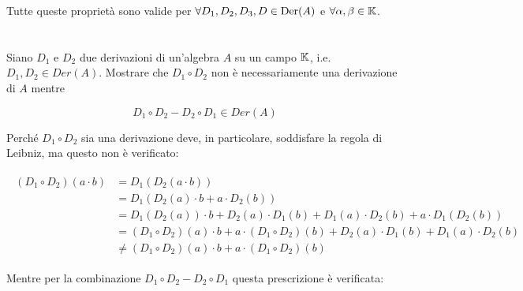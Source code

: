 Tutte queste proprietà sono valide per $ \forall D_{1}, D_{2}, D_{3}, D \in \operatorname{Der}(A) $ e $ \forall \alpha, \beta \in \mathbb{K} $.

\tocless\section{}\label{es1-11}

\begin{tcolorbox}
	Siano $ D_{1} $ e $ D_{2} $ due derivazioni di un'algebra $ A $ su un campo $ \mathbb{K} $, i.e. $ D_{1},D_{2} \in Der(A) $. Mostrare che $ D_{1} \circ D_{2} $ non è necessariamente una derivazione di $ A $ mentre
	
	\begin{equation}
		D_{1} \circ D_{2} - D_{2} \circ D_{1} \in Der(A)
	\end{equation}
\end{tcolorbox}

Perché $ D_{1} \circ D_{2} $ sia una derivazione deve, in particolare, soddisfare la regola di Leibniz, ma questo non è verificato:

\begin{align}
	\begin{split}
		(D_{1} \circ D_{2})(a \cdot b) &= D_{1}(D_{2}(a \cdot b))\\
		&= D_{1}( D_{2}(a) \cdot b + a \cdot D_{2}(b) )\\
		&= D_{1}(D_{2}(a)) \cdot b + D_{2}(a) \cdot D_{1}(b) + D_{1}(a) \cdot D_{2}(b) + a \cdot D_{1}(D_{2}(b))\\
		&= (D_{1} \circ D_{2})(a) \cdot b + a \cdot (D_{1} \circ D_{2})(b) + D_{2}(a) \cdot D_{1}(b) + D_{1}(a) \cdot D_{2}(b)\\
		&\neq (D_{1} \circ D_{2})(a) \cdot b + a \cdot (D_{1} \circ D_{2})(b)
	\end{split}
\end{align}

Mentre per la combinazione $ D_{1} \circ D_{2} - D_{2} \circ D_{1} $ questa prescrizione è verificata:

